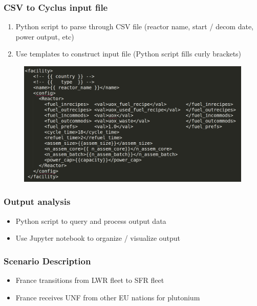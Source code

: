 \begin{frame}
    \frametitle{CSV to Cyclus input file}
    \begin{enumerate}
        \item Python script to parse through CSV file (reactor name, start / decom date, power output, etc)
        \item Use templates to construct input file (Python script fills curly brackets)
    \end{enumerate}
    \begin{figure}[htbp!]
        \begin{center}
                \includegraphics[width=.8\textwidth]{./images/reactor_template.png}
        \end{center}
    \end{figure}
\end{frame}

\begin{frame}
    \frametitle{Output analysis}
    \begin{itemize}
        \item Python script to query and process output data
        \item Use Jupyter notebook to organize / visualize output
    \end{itemize}
\end{frame}

\begin{frame}
    \frametitle{Scenario Description}
    \begin{itemize}
        \item France transitions from LWR fleet to SFR fleet
        \item France receives UNF from other EU nations for plutonium
    \end{itemize}
\end{frame}

